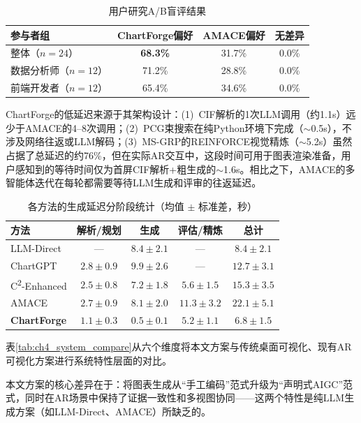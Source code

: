 \begin{table}[H]
\centering
\caption{用户研究A/B盲评结果}
\label{tab:user_study}
\begin{tabular}{l|c|c|c}
\toprule
\textbf{参与者组} & \textbf{ChartForge偏好} & \textbf{AMACE偏好} & \textbf{无差异} \\
\midrule
整体（$n=24$） & \textbf{68.3\%} & 31.7\% & 0.0\% \\
数据分析师（$n=12$） & 71.2\% & 28.8\% & 0.0\% \\
前端开发者（$n=12$） & 65.4\% & 34.6\% & 0.0\% \\
\bottomrule
\end{tabular}
\end{table}

ChartForge的低延迟来源于其架构设计：(1)~CIF解析的1次LLM调用（约1.1s）远少于AMACE的4--8次调用；(2)~PCG束搜索在纯Python环境下完成（$\sim$0.5s），不涉及网络往返或LLM解码；(3)~MS-GRP的REINFORCE视觉精炼（$\sim$5.2s）虽然占据了总延迟的约76\%，但在实际AR交互中，这段时间可用于图表渲染准备，用户感知到的等待时间仅为首屏CIF解析+粗生成的$\sim$1.6s。相比之下，AMACE的多智能体迭代在每轮都需要等待LLM生成和评审的往返延迟。

\begin{table}[H]
\centering
\caption{各方法的生成延迟分阶段统计（均值 $\pm$ 标准差，秒）}
\label{tab:latency_breakdown}
\begin{tabular}{l|c|c|c|c}
\toprule
\textbf{方法} & \textbf{解析/规划} & \textbf{生成} & \textbf{评估/精炼} & \textbf{总计} \\
\midrule
LLM-Direct & — & $8.4 \pm 2.1$ & — & $8.4 \pm 2.1$ \\
ChartGPT & $2.8 \pm 0.9$ & $9.9 \pm 2.6$ & — & $12.7 \pm 3.1$ \\
C\textsuperscript{2}-Enhanced & $2.5 \pm 0.8$ & $7.2 \pm 1.8$ & $5.6 \pm 1.5$ & $15.3 \pm 3.5$ \\
AMACE & $2.7 \pm 0.9$ & $8.1 \pm 2.0$ & $11.3 \pm 3.2$ & $22.1 \pm 5.1$ \\
\midrule
\textbf{ChartForge} & $1.1 \pm 0.3$ & $0.5 \pm 0.1$ & $5.2 \pm 1.1$ & $\mathbf{6.8 \pm 1.5}$ \\
\bottomrule
\end{tabular}
\end{table}

表\ref{tab:ch4_system_compare}从六个维度将本文方案与传统桌面可视化、现有AR可视化方案进行系统特性层面的对比。

本文方案的核心差异在于：将图表生成从“手工编码”范式升级为“声明式AIGC”范式，同时在AR场景中保持了证据一致性和多视图协同——这两个特性是纯LLM生成方案（如LLM-Direct、AMACE）所缺乏的。

